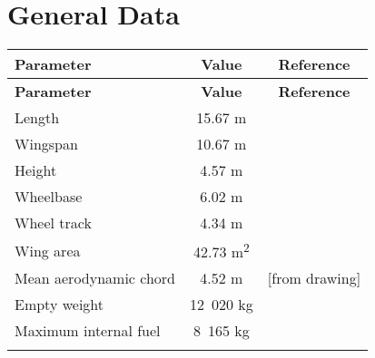 \section{General Data}

\begin{tabularx}{\textwidth}{ | L | c | c | }
  \hline
  \textbf{Parameter}                    & \textbf{Value}   & \textbf{Reference} \\ \hline
  \endfirsthead
  \hline
  \textbf{Parameter}                    & \textbf{Value}   & \textbf{Reference} \\ \hline
  \endhead
  Length                                & 15.67 m          & \cite{Janes20072008} \\ \hline
  Wingspan                              & 10.67 m          & \cite{Janes20072008} \\ \hline
  Height                                & 4.57 m           & \cite{Janes20072008} \\ \hline
  Wheelbase                             & 6.02 m           & \cite{Janes20072008} \\ \hline
  Wheel track                           & 4.34 m           & \cite{Janes20072008} \\ \hline
  Wing area                             & 42.73 m\textsuperscript{2} & \cite{Janes20072008} \\ \hline
  Mean aerodynamic chord                & 4.52 m           & [from drawing] \\ \hline
  Empty weight                          & 12~020 kg        & \cite{Janes20072008} \\ \hline
  Maximum internal fuel                 & 8~165 kg         & \cite{Janes20072008} \\ \hline
  \caption{General Data}
\end{tabularx}
